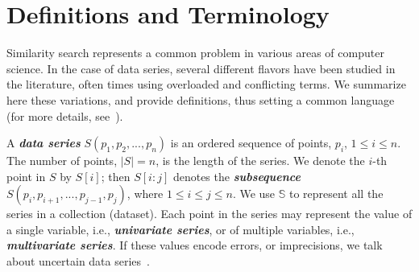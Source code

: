 \section{Definitions and Terminology}
\label{sec:problem}


Similarity search represents a common problem in various areas of computer science.
In the case of data series, several different flavors have been studied in the literature, often times using overloaded and conflicting terms.
We summarize here these variations, and provide definitions, thus setting a common language (for more details, see~\cite{journal/pvldb/echihabi2018}).

A \textit{\textbf{data series}} $S(p_1,p_2,...,p_n)$ is an ordered sequence of points, $p_i$, $1 \leq i \leq n$.
The number of points, $|S|=n$, is the length of the series.
We denote the $i$-th point in $S$ by $S[i]$; then $S[i:j]$ denotes the \textit{\textbf{subsequence}} $S(p_i,p_{i+1},...,p_{j-1},p_j)$, where $1 \leq i \leq j \leq n$.
We use $\mathbb{S}$ to represent all the series in a collection (dataset).
Each point in the series may represent the value of a single variable, i.e., \textit{\textbf{univariate series}}, or of multiple variables, i.e., \textit{\textbf{multivariate series}}.
If these values encode errors, or imprecisions, we talk about uncertain data  series~\cite{DBLP:conf/ssdbm/AssfalgKKR09,DBLP:conf/edbt/YehWYC09,DBLP:conf/kdd/SarangiM10,DBLP:journals/pvldb/DallachiesaNMP12,journal/vldb/Dallachiesa2014}.

